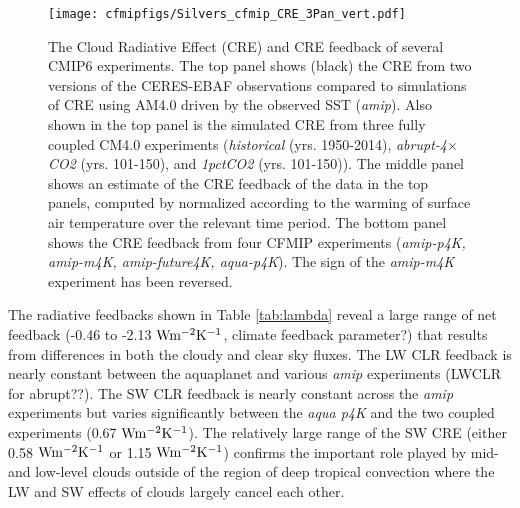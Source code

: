 \documentclass[draft]{agujournal2019}
\begin{document}
\begin{figure}
  \centering
  \texttt{[image: cfmipfigs/Silvers\_cfmip\_CRE\_3Pan\_vert.pdf]}
  \caption{The Cloud Radiative Effect (CRE) and CRE feedback of several CMIP6 experiments.  The top panel 
  shows (black) the CRE from two versions of the CERES-EBAF observations compared to 
  simulations of CRE using AM4.0 driven by the observed SST (\textit{amip}).  Also 
  shown in the top panel is the simulated CRE from three fully coupled CM4.0 experiments (\textit{historical} (yrs. 1950-2014),
  \textit{abrupt-4$\times$CO2} (yrs. 101-150), and \textit{1pctCO2} (yrs. 101-150)).  The middle panel shows an estimate of the 
  CRE feedback of the data in the top panels, computed by normalized according to the warming of surface air temperature over 
  the relevant time period.  The bottom panel shows the CRE feedback from four 
  CFMIP experiments (\textit{amip-p4K, amip-m4K, amip-future4K, aqua-p4K}).  The sign of the \textit{amip-m4K} experiment has 
  been reversed.}
  \label{fig:CRE_feedback}
\end{figure}    


%
%

The radiative feedbacks shown in Table \ref{tab:lambda} reveal a large range of net feedback 
(-0.46 to -2.13 $\rm{W m^{-2}K^{-1}}$, climate feedback parameter?) that results from differences in 
both the cloudy and clear sky fluxes.   The LW CLR feedback is nearly constant between the 
aquaplanet and various \textit{amip} experiments (LWCLR for abrupt??).   The SW CLR 
feedback is nearly constant across the \textit{amip} experiments but varies significantly
between the \textit{aqua p4K} and the two coupled experiments (0.67 $\rm{W m^{-2}K^{-1}}$).
The relatively large range of the SW CRE (either 0.58 $\rm{W m^{-2}K^{-1}}$ or 1.15 $\rm{W m^{-2}K^{-1}}$)
confirms the important role played by mid- and low-level clouds outside of the region of 
deep tropical convection where the LW and SW effects of clouds largely cancel each other.  
\end{document}
